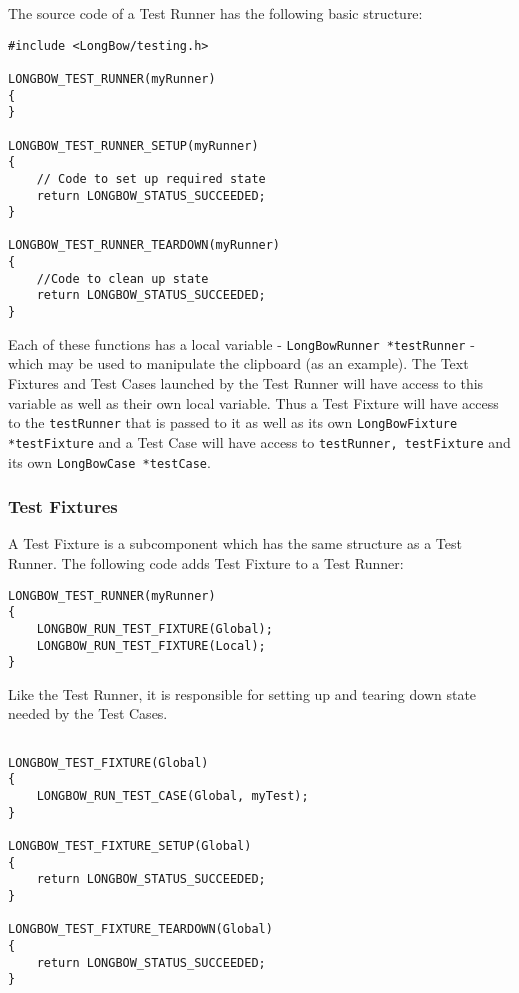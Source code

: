 \documentclass[12pt]{article} %
\begin{document}
\noindent The source code of a Test Runner has the following basic structure:

\begin{lstlisting}
#include <LongBow/testing.h>

LONGBOW_TEST_RUNNER(myRunner)
{
}

LONGBOW_TEST_RUNNER_SETUP(myRunner)
{
    // Code to set up required state
    return LONGBOW_STATUS_SUCCEEDED;
}

LONGBOW_TEST_RUNNER_TEARDOWN(myRunner)
{
    //Code to clean up state
    return LONGBOW_STATUS_SUCCEEDED;
}

\end{lstlisting}


Each of these functions has a local variable - {\tt LongBowRunner *testRunner} - which may be used to manipulate the clipboard (as an example).  The Text Fixtures and Test Cases launched by the Test Runner will have access to this variable as well as their own local variable.  Thus a Test Fixture will have access to the {\tt  testRunner} that is passed to it as well as its own {\tt LongBowFixture *testFixture} and a Test Case will have access to {\tt testRunner, testFixture} and its own {\tt LongBowCase *testCase}.

\subsubsection{Test Fixtures}


A Test Fixture is a subcomponent which has the same structure as a Test Runner. The following code adds Test Fixture to a Test Runner:

\begin{lstlisting}
LONGBOW_TEST_RUNNER(myRunner)
{
    LONGBOW_RUN_TEST_FIXTURE(Global);
    LONGBOW_RUN_TEST_FIXTURE(Local);
}
\end{lstlisting}


Like the Test Runner, it is responsible for setting up and tearing down state needed by the Test Cases.   

\begin{lstlisting}
 
LONGBOW_TEST_FIXTURE(Global)
{
    LONGBOW_RUN_TEST_CASE(Global, myTest);
}

LONGBOW_TEST_FIXTURE_SETUP(Global)
{
    return LONGBOW_STATUS_SUCCEEDED;
}

LONGBOW_TEST_FIXTURE_TEARDOWN(Global)
{
    return LONGBOW_STATUS_SUCCEEDED;
}
\end{lstlisting}
\end{document}
